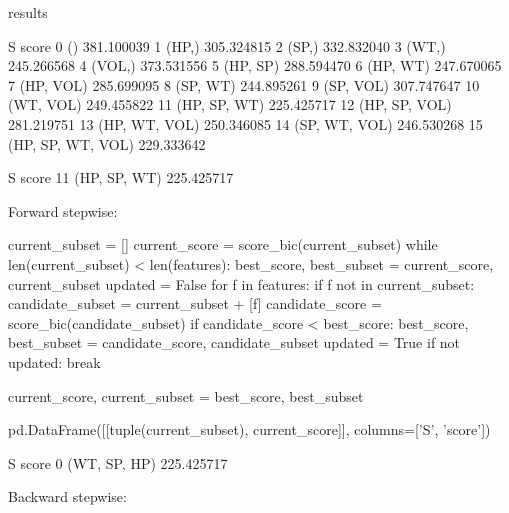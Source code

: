 \begin{python}
results
\end{python}
\begin{console}
                    S       score
0                  ()  381.100039
1               (HP,)  305.324815
2               (SP,)  332.832040
3               (WT,)  245.266568
4              (VOL,)  373.531556
5            (HP, SP)  288.594470
6            (HP, WT)  247.670065
7           (HP, VOL)  285.699095
8            (SP, WT)  244.895261
9           (SP, VOL)  307.747647
10          (WT, VOL)  249.455822
11       (HP, SP, WT)  225.425717
12      (HP, SP, VOL)  281.219751
13      (HP, WT, VOL)  250.346085
14      (SP, WT, VOL)  246.530268
15  (HP, SP, WT, VOL)  229.333642
\end{console}

\begin{python}
\end{python}
\begin{console}
               S       score
11  (HP, SP, WT)  225.425717
\end{console}
Forward stepwise:

\begin{python}
current_subset = []
current_score = score_bic(current_subset)
while len(current_subset) < len(features):
    best_score, best_subset = current_score, current_subset
    updated = False
    for f in features:
        if f not in current_subset:
            candidate_subset = current_subset + [f]
            candidate_score = score_bic(candidate_subset)
            if candidate_score < best_score:
                best_score, best_subset = candidate_score, candidate_subset
                updated = True              
    if not updated:
        break
        
    current_score, current_subset = best_score, best_subset
    
pd.DataFrame([[tuple(current_subset), current_score]], columns=['S', 'score'])
\end{python}
\begin{console}
              S       score
0  (WT, SP, HP)  225.425717
\end{console}
Backward stepwise:

